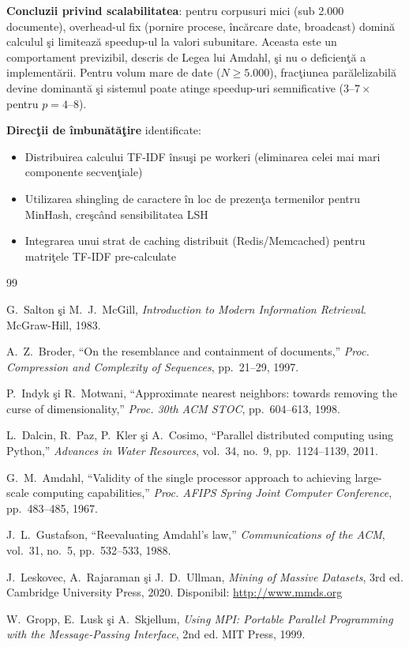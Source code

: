 \documentclass[a4paper,12pt]{report}
\begin{document}
\textbf{Concluzii privind scalabilitatea}: pentru corpusuri mici (sub 2.000 documente), overhead-ul fix (pornire procese, \^{i}nc\u{a}rcare date, broadcast) domin\u{a} calculul \c{s}i limiteaz\u{a} speedup-ul la valori subunitare. Aceasta este un comportament previzibil, descris de Legea lui Amdahl, \c{s}i nu o deficien\c{t}\u{a} a implement\u{a}rii. Pentru volum mare de date ($N \geq 5.000$), frac\c{t}iunea par\u{a}lelizabil\u{a} devine dominant\u{a} \c{s}i sistemul poate atinge speedup-uri semnificative ($3$–$7\times$ pentru $p=4$–$8$).

\textbf{Direc\c{t}ii de \^{i}mbun\u{a}t\u{a}\c{t}ire} identificate:
\begin{itemize}
  \item Distribuirea calcului TF-IDF \^{i}nsu\c{s}i pe workeri (eliminarea celei mai mari componente secven\c{t}iale)
  \item Utilizarea shingling de caractere \^{i}n loc de prezen\c{t}a termenilor pentru MinHash, cre\c{s}c\^{a}nd sensibilitatea LSH
  \item Integrarea unui strat de caching distribuit (Redis/Memcached) pentru matri\c{t}ele TF-IDF pre-calculate
\end{itemize}

\begin{thebibliography}{99}

G.~Salton \c{s}i M.~J.~McGill,
\textit{Introduction to Modern Information Retrieval}.
McGraw-Hill, 1983.

A.~Z.~Broder,
``On the resemblance and containment of documents,''
\textit{Proc. Compression and Complexity of Sequences}, pp.~21--29, 1997.

P.~Indyk \c{s}i R.~Motwani,
``Approximate nearest neighbors: towards removing the curse of dimensionality,''
\textit{Proc. 30th ACM STOC}, pp.~604--613, 1998.

L.~Dalcin, R.~Paz, P.~Kler \c{s}i A.~Cosimo,
``Parallel distributed computing using Python,''
\textit{Advances in Water Resources}, vol.~34, no.~9, pp.~1124--1139, 2011.

G.~M.~Amdahl,
``Validity of the single processor approach to achieving large-scale computing capabilities,''
\textit{Proc. AFIPS Spring Joint Computer Conference}, pp.~483--485, 1967.

J.~L.~Gustafson,
``Reevaluating Amdahl's law,''
\textit{Communications of the ACM}, vol.~31, no.~5, pp.~532--533, 1988.

J.~Leskovec, A.~Rajaraman \c{s}i J.~D.~Ullman,
\textit{Mining of Massive Datasets}, 3rd ed.
Cambridge University Press, 2020.
Disponibil: \url{http://www.mmds.org}

W.~Gropp, E.~Lusk \c{s}i A.~Skjellum,
\textit{Using MPI: Portable Parallel Programming with the Message-Passing Interface}, 2nd ed.
MIT Press, 1999.

\end{thebibliography}
\end{document}
